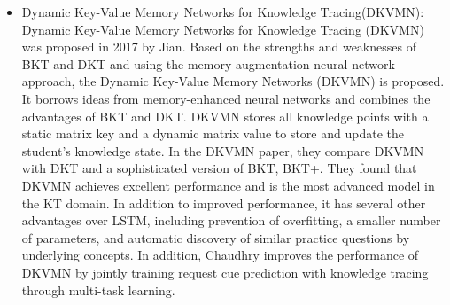 \begin{itemize}
	\item Dynamic Key-Value Memory Networks for Knowledge Tracing(DKVMN): Dynamic Key-Value Memory Networks for Knowledge Tracing (DKVMN) was proposed in 2017 by  Jian\cite{zhang2017dynamic}. Based on the strengths and weaknesses of BKT and DKT and using the memory augmentation neural network approach, the Dynamic Key-Value Memory Networks (DKVMN) is proposed. It borrows ideas from memory-enhanced neural networks and combines the advantages of BKT and DKT. DKVMN stores all knowledge points with a static matrix key and a dynamic matrix value to store and update the student's knowledge state. In the DKVMN paper, they compare DKVMN with DKT and a sophisticated version of BKT, BKT+. They found that DKVMN achieves excellent performance and is the most advanced model in the KT domain. In addition to improved performance, it has several other advantages over LSTM, including prevention of overfitting, a smaller number of parameters, and automatic discovery of similar practice questions by underlying concepts. In addition, Chaudhry\cite{chaudhry2018modeling} improves the performance of DKVMN by jointly training request cue prediction with knowledge tracing through multi-task learning.
\end{itemize}



